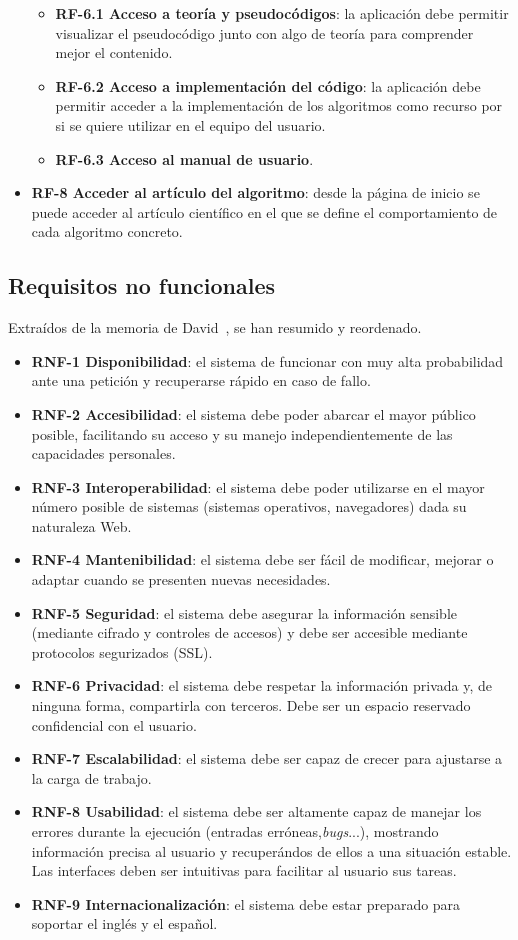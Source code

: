\begin{itemize}
	\begin{itemize}
		\item \textbf{RF-6.1 Acceso a teoría y pseudocódigos}: la aplicación debe permitir visualizar el pseudocódigo junto con algo de teoría para comprender mejor el contenido.
		\item \textbf{RF-6.2 Acceso a implementación del código}: la aplicación debe permitir acceder a la implementación de los algoritmos como recurso por si se quiere utilizar en el equipo del usuario.
		\item \textbf{RF-6.3 Acceso al manual de usuario}.
	\end{itemize}
	\item \textbf{RF-8 Acceder al artículo del algoritmo}: desde la página de inicio se puede acceder al artículo científico en el que se define el comportamiento de cada algoritmo concreto.
\end{itemize}

\subsection{Requisitos no funcionales}
Extraídos de la memoria de David~\cite{TFG:David}, se han resumido y reordenado.
\begin{itemize}
	\item \textbf{RNF-1 Disponibilidad}: el sistema de funcionar con muy alta probabilidad ante una petición y recuperarse rápido en caso de fallo.
	\item \textbf{RNF-2 Accesibilidad}: el sistema debe poder abarcar el mayor público posible, facilitando su acceso y su manejo independientemente de las capacidades personales.
	\item \textbf{RNF-3 Interoperabilidad}: el sistema debe poder utilizarse en el mayor número posible de sistemas (sistemas operativos, navegadores) dada su naturaleza Web.
	\item \textbf{RNF-4 Mantenibilidad}: el sistema debe ser fácil de modificar, mejorar o adaptar cuando se presenten nuevas necesidades.
	\item \textbf{RNF-5 Seguridad}: el sistema debe asegurar la información sensible (mediante cifrado y controles de accesos) y debe ser accesible mediante protocolos segurizados (SSL).
	\item \textbf{RNF-6 Privacidad}: el sistema debe respetar la información privada y, de ninguna forma, compartirla con terceros. Debe ser un espacio reservado confidencial con el usuario.
	\item \textbf{RNF-7 Escalabilidad}: el sistema debe ser capaz de crecer para ajustarse a la carga de trabajo.
	\item \textbf{RNF-8 Usabilidad}: el sistema debe ser altamente capaz de manejar los errores durante la ejecución (entradas erróneas,\textit{bugs}...), mostrando información precisa al usuario y recuperándos de ellos a una situación estable. Las interfaces deben ser intuitivas para facilitar al usuario sus tareas.
	\item \textbf{RNF-9 Internacionalización}: el sistema debe estar preparado para soportar el inglés y el español.
	
\end{itemize}

